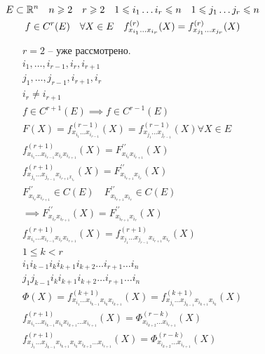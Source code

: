 \documentclass[main]{subfiles}
\begin{document}
    \begin{theorem}
        \begin{gather*}
            E \subset \mathbb{R}^n \quad n \geqslant 2 \quad r \geqslant 2 \quad 1 \leqslant i_1 \ldots i_r \leqslant n \quad 1 \leqslant j_1 \ldots j_r \leqslant n \\
            f \in C^r(E) \quad \forall X \in E \quad f^{(r)}_{x_{i_1} \ldots x_{i_r}}(X) = f^{(r)}_{x_{j_1} \ldots x_{j_r}}(X) 
        \end{gather*}
    \end{theorem}
        \begin{longProof}[по индукции]
            \begin{gather*}
                r = 2 \text{ -- уже  рассмотрено.} \\
                i_1, \ldots, i_{r-1}, i_r, i_{r+1} \\
                j_1, \ldots, j_{r-1}, i_{r+1}, i_r\\
                i_r \ne i_{r+1} \\
                f \in  C^{r+1}(E) \implies f \in C^{r-1}(E) \\
                F(X) = f^{(r-1)}_{x_{i_1} \ldots x_{i_{r-1}}}(X) = f^{(r-1)}_{x_{j_1} \ldots x_{j_{r-1}}}(X) \forall X \in E \\
                f^{(r+1)}_{x_{i_1} \ldots x_{i_{r-1}} x_{i_r} x_{i_{r+1}}}(X) = F^{\prime\prime}_{x_{i_r} x_{i_{r+1}}}(X) \\
                f^{(r+1)}_{x_{j_1} \ldots x_{j_{r-1}} x_{i_{r+1} x_{i_r}}}(X) = F^{\prime\prime}_{x_{i_{r+1}} x_{i_r}}(X) \\
                F^{\prime\prime}_{x_{i_r} x_{i_{r+1}}} \in C(E) \quad F^{\prime\prime}_{x_{i_{r+1}}x_{i_r}} \in C(E) \\
                \implies F^{\prime\prime}_{x_{i_r}x_{i_{r+1}}}(X) = F^{\prime\prime}_{x_{i_{r+1}} x_{i_r}}(X) \\
                f^{(r+1)}_{x_{i_1} \ldots x_{i_{r-1}} x_{i_r} x_{i_{r+1}}}(X) =  f^{(r+1)}_{x_{j_1} \ldots x_{j_{r-1}} x_{i_{r+1}} x_{i_r}}(X) \\
                1 \leq k < r \\
                i_{1} i_{k-1} i_k i_{k+1} i_{k+2} \ldots i_{r+1} \ldots i_n \\
                j_{1} j_{k-1} i_k i_{k+1} i_{k+2} \ldots i_{r+1} \ldots i_n \\
                \Phi(X) = f^{(k+1)}_{x_{i_1} \ldots x_{i_{k-1}} x_{i_k} x_{i_{k+1}}}(X) = f^{(k+1)}_{x_{j_1} \ldots x_{j_{k-1}} x_{i_{k+1}} x_{i_k}}(X)  \\
                f^{(r+1)}_{x_{i_1} \ldots x_{i_{k-1}} x_{i_k} x_{i_{k+1}} \ldots x_{i_{r+1}}}(X) = \Phi^{(r-k)}_{x_{i_{k+2}} \ldots x_{i_{r+1}}}(X) \\ 
                f^{(r+1)}_{x_{j_1} \ldots x_{j_{k-1}}  x_{i_{k+1}} x_{i_k} x_{i_{k+2}}\ldots x_{i_{r+1}}}(X) = \Phi^{(r-k)}_{x_{i_{k+2}} \ldots x_{i_{r+1}}}(X) 
            \end{gather*}
        \end{longProof}
\end{document}
